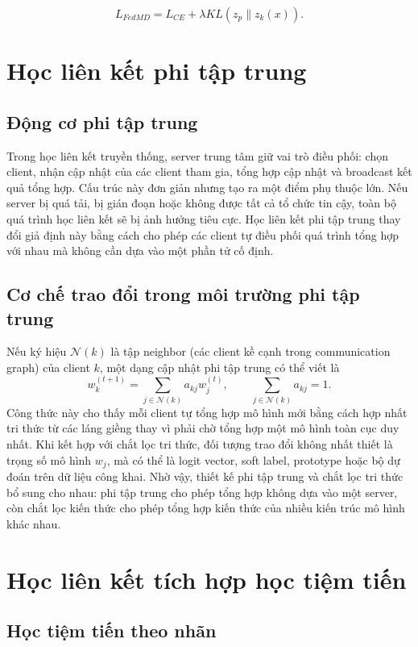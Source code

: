 $$
L_{FedMD} = L_{CE} + \lambda KL(z_{p} \| z_k(x)).
$$

\section{Học liên kết phi tập trung}

\subsection{Động cơ phi tập trung}

Trong học liên kết truyền thống, server trung tâm giữ vai trò điều phối: chọn client, nhận cập nhật của các client tham gia, tổng hợp cập nhật và broadcast kết quả tổng hợp. Cấu trúc này đơn giản nhưng tạo ra một điểm phụ thuộc lớn. Nếu server bị quá tải, bị gián đoạn hoặc không được tất cả tổ chức tin cậy, toàn bộ quá trình học liên kết sẽ bị ảnh hưởng tiêu cực. Học liên kết phi tập trung thay đổi giả định này bằng cách cho phép các client tự điều phối quá trình tổng hợp với nhau mà không cần dựa vào một phần tử cố định.

\subsection{Cơ chế trao đổi trong môi trường phi tập trung}

Nếu ký hiệu $\mathcal{N}(k)$ là tập neighbor (các client kề cạnh trong communication graph) của client $k$, một dạng cập nhật phi tập trung có thể viết là
$$
w_k^{(t+1)}=\sum_{j\in\mathcal{N}(k)}a_{kj}w_j^{(t)},
\qquad \sum_{j\in\mathcal{N}(k)}a_{kj}=1.
$$
Công thức này cho thấy mỗi client tự tổng hợp mô hình mới bằng cách hợp nhất tri thức từ các láng giềng thay vì phải chờ tổng hợp một mô hình toàn cục duy nhất. Khi kết hợp với chắt lọc tri thức, đối tượng trao đổi không nhất thiết là trọng số mô hình $w_j$, mà có thể là logit vector, soft label, prototype hoặc bộ dự đoán trên dữ liệu công khai. Nhờ vậy, thiết kế phi tập trung và chắt lọc tri thức bổ sung cho nhau: phi tập trung cho phép tổng hợp không dựa vào một server, còn chắt lọc kiến thức cho phép tổng hợp kiến thức của nhiều kiến trúc mô hình khác nhau.

\section{Học liên kết tích hợp học tiệm tiến}

\subsection{Học tiệm tiến theo nhãn}

